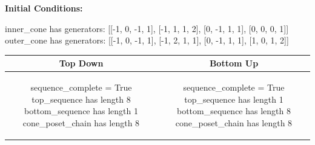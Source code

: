 \documentclass[10pt]{article}
\begin{document}
\textbf{Initial Conditions:}
\begin{SAGE}
inner_cone has generators: 
[[-1, 0, -1, 1], [-1, 1, 1, 2], [0, -1, 1, 1], [0, 0, 0, 1]]
outer_cone has generators: 
[[-1, 0, -1, 1], [-1, 2, 1, 1], [0, -1, 1, 1], [1, 0, 1, 2]]

\end{SAGE}
\begin{tabular}{c|c}
\textbf{Top Down} & \textbf{Bottom Up} \\ \hline  
\begin{SAGE}
sequence_complete = True
top_sequence has length 8
bottom_sequence has length 1
cone_poset_chain has length 8
\end{SAGE} 
&
\begin{SAGE}
sequence_complete = True
top_sequence has length 1
bottom_sequence has length 8
cone_poset_chain has length 8
\end{SAGE} 
\\ \hline


\end{tabular}
\end{document}
